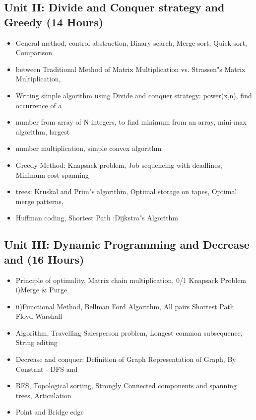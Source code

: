 \documentclass[12pt,a4paper]{article}%
\begin{document}
%
\subsection{Unit II: Divide and Conquer strategy and Greedy (14 Hours)}%
\label{subsec:UnitIIDivideandConquerstrategyandGreedy(14Hours)}%
\begin{itemize}%
\item General method, control abstraction, Binary search, Merge sort, Quick sort, Comparison%
\item between Traditional Method of Matrix Multiplication vs. Strassen"s Matrix Multiplication,%
\item Writing simple algorithm using Divide and conquer strategy: power(x,n), find occurrence of a%
\item number from array of N integers, to find minimum from an array, mini-max algorithm, largest%
\item number multiplication, simple convex algorithm%
\item Greedy Method: Knapsack problem, Job sequencing with deadlines, Minimum-cost spanning%
\item trees: Kruskal and Prim"s algorithm, Optimal storage on tapes, Optimal merge patterns,%
\item Huffman coding, Shortest Path :Dijkstra"s Algorithm%
\end{itemize}

%
\subsection{Unit III: Dynamic Programming and Decrease and (16 Hours)}%
\label{subsec:UnitIIIDynamicProgrammingandDecreaseand(16Hours)}%
\begin{itemize}%
\item Principle of optimality, Matrix chain multiplication, 0/1 Knapsack Problem i)Merge \& Purge%
\item ii)Functional Method, Bellman Ford Algorithm, All pairs Shortest Path Floyd-Warshall%
\item Algorithm, Travelling Salesperson problem, Longest common subsequence, String editing%
\item Decrease and conquer: Definition of Graph Representation of Graph, By Constant - DFS and%
\item BFS, Topological sorting, Strongly Connected components and spanning trees, Articulation%
\item Point and Bridge edge%
\end{itemize}
\end{document}
